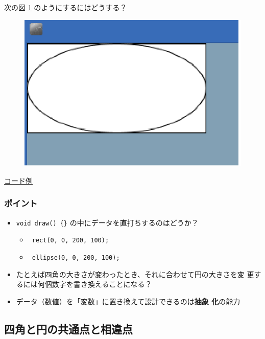 \documentclass[uplatex,a4j,11pt]{jsarticle}
\begin{document}
次の図 \ref{145345_19Jul14} のようにするにはどうする？

\begin{figure}[htbp]
  \begin{center}
   \includegraphics{zu1.eps}
   \caption{}
   \label{145345_19Jul14}
  \end{center}
\end{figure}

\href{prim00.txt}{コード例}


\subsubsection{ポイント}
\begin{itemize}
 \item \verb|void draw() {}| の中にデータを直打ちするのはどうか？
       \begin{itemize}
        \item \verb| rect(0, 0, 200, 100);|
        \item \verb| ellipse(0, 0, 200, 100);|
       \end{itemize}
 \item たとえば四角の大きさが変わったとき、それに合わせて円の大きさを変
       更するには何個数字を書き換えることになる？
 \item データ（数値）を「変数」に置き換えて設計できるのは{\bfseries 抽象
       化}の能力
\end{itemize}

\subsection{四角と円の共通点と相違点}
\end{document}
